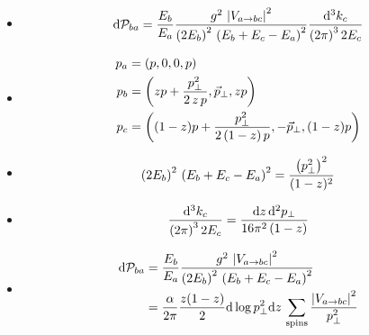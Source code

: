 \begin{subappendices}
\begin{itemize}
    \item
        \begin{align}
            \dd \mathcal{P}_{ba}
            =
            \frac{E_b}{E_a}
            \frac{
                g^2 \, \left| V_{a \to b c} \right|^2
            }
            {
                \left(2 E_b\right)^2
                \,
                \left(E_b + E_c - E_a\right)^2
            }
            \frac{\dd^3 k_c}{\left(2\pi\right)^3 2 E_c}
        \end{align}

    \item
        \begin{subequations}
        \begin{align}
            p_a &= \left(p, 0, 0, p\right)
            \\
            p_b &= \left(z p + \frac{p_\perp^2}{2\,z\,p}, \vec{p}_\perp, z p\right)
            \\
            p_c &= \left((1-z)p + \frac{p_\perp^2}{2\,(1-z)\,p}, -\vec{p}_\perp, (1-z) p\right)
        \end{align}
        \end{subequations}

    \item
        \begin{align}
            \left(2 E_b\right)^2
            \,
            \left(E_b + E_c - E_a\right)^2
            =
            \frac{\left(p_\perp^2\right)^2}{(1-z)^2}
        \end{align}

    \item
        \begin{align}
            \frac{\dd^3 k_c}{\left(2\pi\right)^3 2 E_c}
            =
            \frac{\dd z \, \dd^2 p_\perp}{16\pi^2\,(1-z)}
        \end{align}

    \item
        \begin{align}
            \dd \mathcal{P}_{ba}
            &=
            \frac{E_b}{E_a}
            \frac{
                g^2 \, \left| V_{a \to b c} \right|^2
            }
            {
                \left(2 E_b\right)^2
                \,
                \left(E_b + E_c - E_a\right)^2
            }
            \\
            &=
            \frac{\alpha}{2\pi}
            \frac{z(1-z)}{2}
            \dd\log p_\perp^2
            \dd z
            \,
            \sum_\text{spins}
            \frac{\left| V_{a \to b c} \right|^2}{p_\perp^2}
        \end{align}


\end{itemize}
\end{subappendices}
